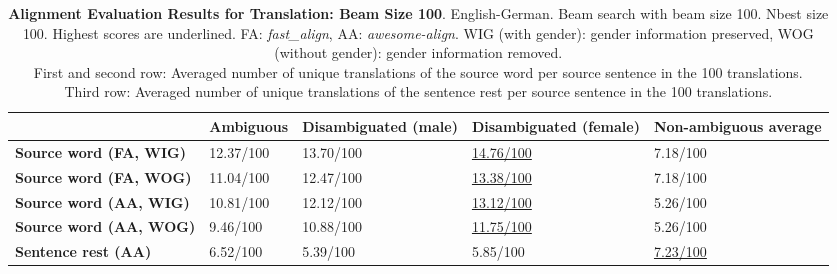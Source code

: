 \begin{table} 
    \label{tab:alignment_translation_100}
    \begin{tabularx}{\linewidth}{|X|XXXX|}
        \hline
         & \textbf{Ambiguous} & \textbf{Disambiguated (male)} & \textbf{Disambiguated (female)} & \textbf{Non-ambiguous average} \\ \hline
         \textbf{Source word (FA, WIG)} & 12.37/100 & 13.70/100 & \underline{14.76/100} & 7.18/100 \\
         \textbf{Source word (FA, WOG)} & 11.04/100 & 12.47/100 & \underline{13.38/100} & 7.18/100 \\
         \textbf{Source word (AA, WIG)} & 10.81/100 & 12.12/100 & \underline{13.12/100} & 5.26/100 \\ 
         \textbf{Source word (AA, WOG)} & 9.46/100 & 10.88/100 & \underline{11.75/100} & 5.26/100 \\\hline 
         \textbf{Sentence rest (AA)} & 6.52/100 & 5.39/100 & 5.85/100 & \underline{7.23/100} \\ \hline
    \end{tabularx}
    \caption{\textbf{Alignment Evaluation Results for Translation: Beam Size 100}. English-German. Beam search with beam size 100. Nbest size 100. Highest scores are underlined. FA: \textit{fast\_align}, AA: \textit{awesome-align}. WIG (with gender): gender information preserved, WOG (without gender): gender information removed. \\ First and second row: Averaged number of unique translations of the source word per source sentence in the 100 translations. \\ Third row: Averaged number of unique translations of the sentence rest per source sentence in the 100 translations.}
\end{table}

